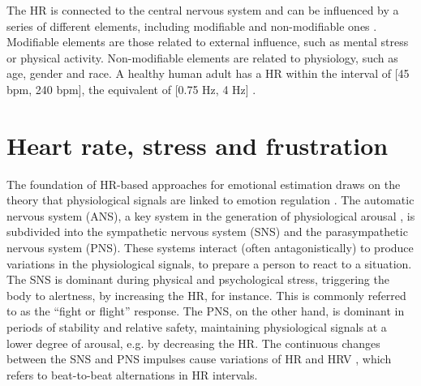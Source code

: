 The HR is connected to the central nervous system and can be influenced by a series of different elements, including modifiable and non-modifiable ones \parencite{valentini2009variables}. Modifiable elements are those related to external influence, such as mental stress or physical activity. Non-modifiable elements are related to physiology, such as age, gender and race. A healthy human adult has a HR within the interval of [45 bpm, 240 bpm], the equivalent of [0.75 Hz, 4 Hz] \parencite{li2014remote}.


%
%
%

\section{Heart rate, stress and frustration}

The foundation of HR-based approaches for emotional estimation draws on the theory that physiological signals are linked to emotion regulation \parencite{appelhans2006heart,fenton2012emotion,schubert2009effects}. The automatic nervous system (ANS), a key system in the generation of physiological arousal \parencite{appelhans2006heart}, is subdivided into the sympathetic nervous system (SNS) and the parasympathetic nervous system (PNS). These systems interact (often antagonistically) to produce variations in the physiological signals, to prepare a person to react to a situation. The SNS is dominant during physical and psychological stress, triggering the body to alertness, by increasing the HR, for instance. This is commonly referred to as the ``fight or flight'' response. The PNS, on the other hand, is dominant in periods of stability and relative safety, maintaining physiological signals at a lower degree of arousal, e.g. by decreasing the HR. The continuous changes between the SNS and PNS impulses cause variations of HR and HRV \parencite{schubert2009effects}, which refers to beat-to-beat alternations in HR intervals.

